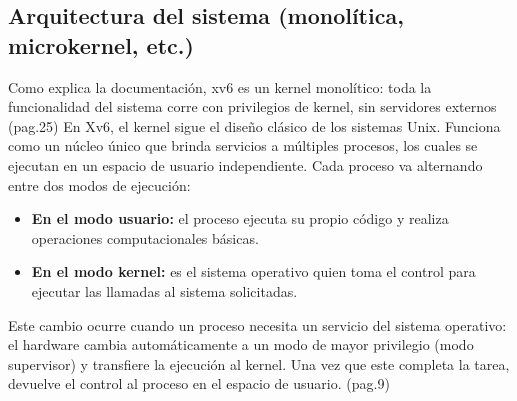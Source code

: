 \subsection{Arquitectura del sistema (monolítica, microkernel, etc.)}
Como explica la documentación, xv6 es un kernel monolítico: toda la funcionalidad del sistema corre con privilegios de kernel, sin servidores externos \citep{xv6_mit} (pag.25)
En Xv6, el kernel sigue el diseño clásico de los sistemas Unix. Funciona como un núcleo único que brinda servicios a múltiples procesos, los cuales se ejecutan en un espacio de usuario independiente.
Cada proceso va alternando entre dos modos de ejecución:
\begin{itemize}
    \item \textbf{En el modo usuario:} el proceso ejecuta su propio código y realiza operaciones computacionales básicas.
    \item \textbf{En el modo kernel:} es el sistema operativo quien toma el control para ejecutar las llamadas al sistema solicitadas.
\end{itemize}
Este cambio ocurre cuando un proceso necesita un servicio del sistema operativo: el hardware cambia automáticamente a un modo de mayor privilegio (modo supervisor) y transfiere la ejecución al kernel. Una vez que este completa la tarea, devuelve el control al proceso en el espacio de usuario.\citep{xv6_mit} (pag.9)

